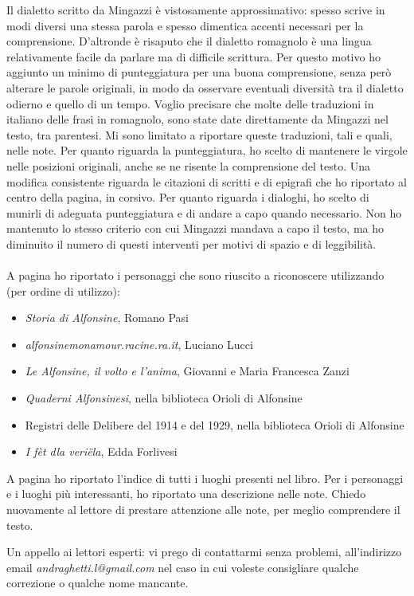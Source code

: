 \newpage
\noindent Il dialetto scritto da Mingazzi è vistosamente approssimativo: spesso scrive in modi diversi una stessa parola e spesso dimentica accenti necessari per la comprensione. D'altronde è risaputo che il dialetto romagnolo è una lingua relativamente facile da parlare ma di difficile scrittura. Per questo motivo ho aggiunto un minimo di punteggiatura per una buona comprensione, senza però alterare le parole originali, in modo da osservare eventuali diversità tra il dialetto odierno e quello di un tempo. Voglio precisare che molte delle traduzioni in italiano delle frasi in romagnolo, sono state date direttamente da Mingazzi nel testo, tra parentesi. Mi sono limitato a riportare queste traduzioni, tali e quali, nelle note. Per quanto riguarda la punteggiatura, ho scelto di mantenere le virgole nelle posizioni originali, anche se ne risente la comprensione del testo. Una modifica consistente riguarda le citazioni di scritti e di epigrafi che ho riportato al centro della pagina, in corsivo. Per quanto riguarda i dialoghi, ho scelto di munirli di adeguata punteggiatura e di andare a capo quando necessario. Non ho mantenuto lo stesso criterio con cui Mingazzi mandava a capo il testo, ma ho diminuito il numero di questi interventi per motivi di spazio e di leggibilità.	\\\\
\label{fonti}
\noindent A pagina \pageref{Personaggi} ho riportato i personaggi che sono riuscito a riconoscere utilizzando (per ordine di utilizzo):
\begin{itemize}\itemsep2pt
\item{\emph{Storia di Alfonsine}, Romano Pasi}
\item{\emph{alfonsinemonamour.racine.ra.it}, Luciano Lucci}
\item{\emph{Le Alfonsine, il volto e l'anima}, Giovanni e Maria Francesca Zanzi}
\item{\emph{Quaderni Alfonsinesi}, nella biblioteca Orioli di Alfonsine}
\item{Registri delle Delibere del 1914 e del 1929, nella biblioteca Orioli di Alfonsine}
\item{\emph{I fèt dla veriëla}, Edda Forlivesi}
\end{itemize}

A pagina \pageref{Luoghi} ho riportato l'indice di tutti i luoghi presenti nel libro. Per i personaggi e i luoghi più interessanti, ho riportato una descrizione nelle note. Chiedo nuovamente al lettore di prestare attenzione alle note, per meglio comprendere il testo.\\

\vspace{1cm}

Un appello ai lettori esperti: vi prego di contattarmi senza problemi, all'indirizzo email \textit{andraghetti.l@gmail.com} nel caso in cui voleste consigliare qualche correzione o qualche nome mancante.\\

